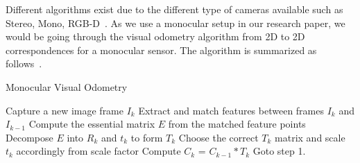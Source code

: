 Different algorithms exist due to the different type of cameras available such as Stereo, Mono, RGB-D~\cite{scaramuzza2011visual,fraundorfer2012visual}. As we use a monocular setup in our research paper, we would be going through the visual odometry algorithm from 2D to 2D correspondences for a monocular sensor. The algorithm is summarized as follows~\cite{scaramuzza2011visual}.

\begin{algorithm}[H]
    \caption{Monocular Visual Odometry}
	\begin{algorithmic}[1]
		\STATE Capture a new image frame $I_k$
    	\STATE Extract and match features between frames $I_k$ and $I_{k-1}$
    	\STATE Compute the essential matrix $E$ from the matched feature points
    	\STATE Decompose $E$ into $R_k$ and $t_k$ to form $T_k$
    	\STATE Choose the correct $T_k$ matrix and scale $t_k$ accordingly from scale factor
    	\STATE Compute $C_k$ = $C_{k-1}*T_k$
    	\STATE Goto step 1.
	\end{algorithmic}
\end{algorithm}

